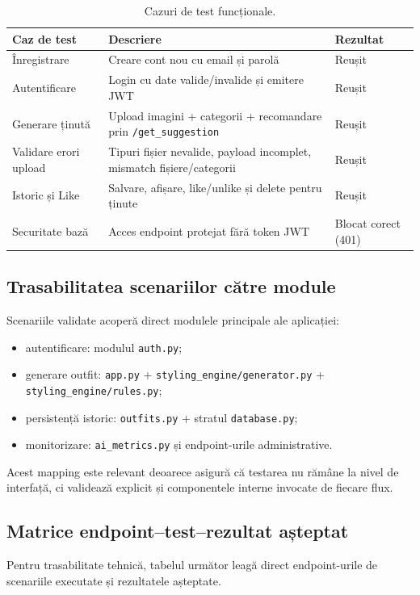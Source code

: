 \begin{table}[h]
    \centering
    \begin{tabular}{|l|p{6cm}|p{3cm}|}
    \hline
    \textbf{Caz de test} & \textbf{Descriere} & \textbf{Rezultat} \\ \hline
    Înregistrare & Creare cont nou cu email și parolă & Reușit \\ \hline
    Autentificare & Login cu date valide/invalide și emitere JWT & Reușit \\ \hline
    Generare ținută & Upload imagini + categorii + recomandare prin \texttt{/get\_suggestion} & Reușit \\ \hline
    Validare erori upload & Tipuri fișier nevalide, payload incomplet, mismatch fișiere/categorii & Reușit \\ \hline
    Istoric și Like & Salvare, afișare, like/unlike și delete pentru ținute & Reușit \\ \hline
    Securitate bază & Acces endpoint protejat fără token JWT & Blocat corect (401) \\ \hline
    \end{tabular}
    \caption{Cazuri de test funcționale.}
    \label{tab:test_cases}
\end{table}

\subsection{Trasabilitatea scenariilor către module}
Scenariile validate acoperă direct modulele principale ale aplicației:
\begin{itemize}
    \item autentificare: modulul \texttt{auth.py};
    \item generare outfit: \texttt{app.py} + \texttt{styling\_engine/generator.py} + \texttt{styling\_engine/rules.py};
    \item persistență istoric: \texttt{outfits.py} + stratul \texttt{database.py};
    \item monitorizare: \texttt{ai\_metrics.py} și endpoint-urile administrative.
\end{itemize}

Acest mapping este relevant deoarece asigură că testarea nu rămâne la nivel de interfață, ci validează explicit și componentele interne invocate de fiecare flux.

\subsection{Matrice endpoint--test--rezultat așteptat}
Pentru trasabilitate tehnică, tabelul următor leagă direct endpoint-urile de scenariile executate și rezultatele așteptate.

